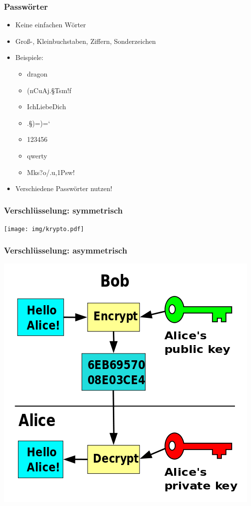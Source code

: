 \documentclass[12pt]{beamer}
\begin{document}
\begin{frame}
    \frametitle{Passwörter}
    \begin{itemize}
        \item<2-> Keine einfachen Wörter
        \item<3-> Groß-, Kleinbuchstaben, Ziffern, Sonderzeichen
        \item<4-> Beispiele:
            \begin{itemize}
                \item<5-> dragon
                \item<6-> (nCuAj.§Tsm!f
                \item<7-> IchLiebeDich
                \item<8-> .§)=)=`
                \item<9-> 123456
                \item<10-> qwerty
                \item<11-> Mks?o/.u,1Psw!
            \end{itemize}
        \item<12-> Verschiedene Passwörter nutzen!
    \end{itemize}
\end{frame}

\begin{frame}
    \frametitle{Verschlüsselung: symmetrisch}
    \begin{center}
	\texttt{[image: img/krypto.pdf]}
    \end{center}	
\end{frame}

\begin{frame}
    \frametitle{Verschlüsselung: asymmetrisch}
    \includegraphics[height=0.7\textheight]{img/asym_encryption.png}
\end{frame}
\end{document}
